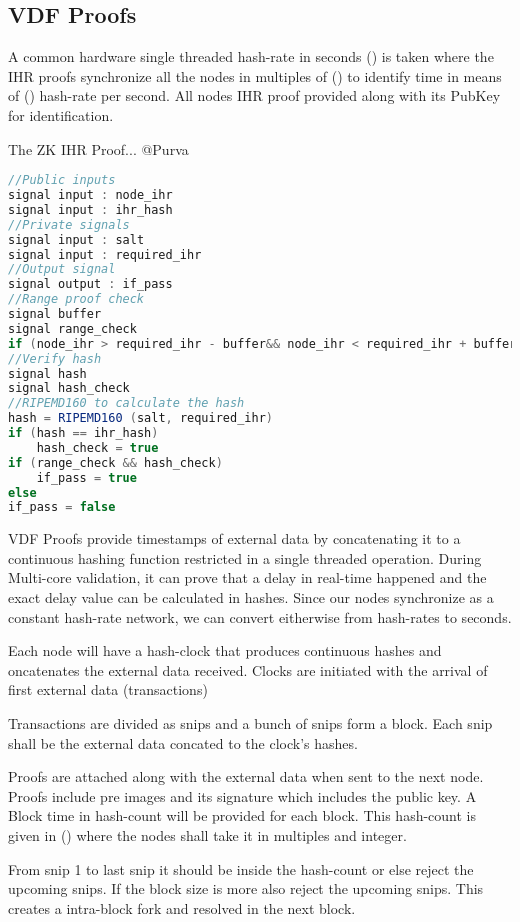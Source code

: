 \documentclass[../Bitcoin Blink.tex]{subfiles}
\begin{document}
\normalsize
\subsection{VDF Proofs}

A common hardware single threaded hash-rate in seconds () is taken where the IHR proofs synchronize all the nodes in multiples of () to identify time in means of () hash-rate per second. All nodes IHR proof provided along with its PubKey for identification.

The ZK IHR Proof... @Purva
\begin{lstlisting}[language=Java, caption=IHR Circuit]
//Public inputs
signal input : node_ihr 
signal input : ihr_hash
//Private signals 
signal input : salt
signal input : required_ihr
//Output signal
signal output : if_pass
//Range proof check 
signal buffer
signal range_check
if (node_ihr > required_ihr - buffer&& node_ihr < required_ihr + buffer) : range_check = true
//Verify hash
signal hash
signal hash_check
//RIPEMD160 to calculate the hash
hash = RIPEMD160 (salt, required_ihr)
if (hash == ihr_hash)
	hash_check = true
if (range_check && hash_check)
	if_pass = true
else 
if_pass = false
\end{lstlisting}

VDF Proofs provide timestamps of external data by concatenating it to a continuous hashing function restricted in a single threaded operation. During Multi-core validation, it can prove that a delay in real-time happened and the exact delay value can be calculated in hashes. Since our nodes synchronize as a constant hash-rate network, we can convert eitherwise from hash-rates to seconds.

Each node will have a hash-clock that produces continuous hashes and oncatenates the external data received. Clocks are initiated with the arrival of first external data (transactions)

Transactions are divided as snips and a bunch of snips form a block. Each snip shall be the external data concated to the clock's hashes.

Proofs are attached along with the external data when sent to the next node. Proofs include pre images and its signature which includes the public key. A Block time in hash-count will be provided for each block. This hash-count is given in () where the nodes shall take it in multiples and integer. 

From snip 1 to last snip it should be inside the hash-count or else reject the upcoming snips. If the block size is more also reject the upcoming snips. This creates a intra-block fork and resolved in the next block. 
\end{document}

